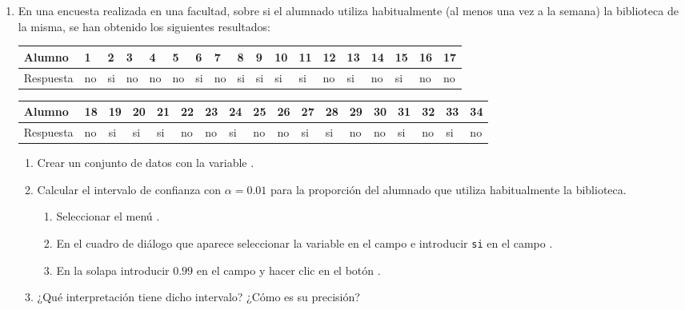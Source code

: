 \begin{enumerate}[leftmargin=*]
\item En una encuesta realizada en una facultad, sobre si el alumnado utiliza habitualmente (al menos una vez a la
semana) la biblioteca de la misma, se han obtenido los siguientes resultados:
\begin{flushleft}
\begin{tabular}{|l|l|l|l|l|l|l|l|l|l|l|l|l|l|l|l|l|l|}
\hline
Alumno & 1 & 2 & 3 & 4 & 5 & 6 & 7 & 8 & 9 & 10 & 11 & 12 & 13 & 14 & 15 & 16 & 17 \\
\hline
Respuesta & no & si & no & no & no & si & no & si & si & si & si & no & si & no & si & no & no \\
\hline
\end{tabular}
\newline

\begin{tabular}{|l|l|l|l|l|l|l|l|l|l|l|l|l|l|l|l|l|l|}
\hline
Alumno & 18 & 19 & 20 & 21 & 22 & 23 & 24 & 25 & 26 & 27 & 28 & 29 & 30 & 31 & 32 & 33 & 34 \\
\hline
Respuesta & no & si & si & si & no & no & si & no & no & si & si & no & no & si & no & si & no \\
\hline
\end{tabular}
\end{flushleft}

\begin{enumerate}
\item Crear un conjunto de datos con la variable .
\item Calcular el intervalo de confianza con $\alpha=0.01$ para la proporción del alumnado que utiliza habitualmente la biblioteca. 
\begin{indicacion}{
\begin{enumerate}
\item Seleccionar el menú .
\item En el cuadro de diálogo que aparece seleccionar la variable  en el campo  e
introducir \texttt{si} en el campo .
\item En la solapa  introducir $0.99$ en el campo  y hacer clic en
el botón .
\end{enumerate}
}
\end{indicacion}

\item ¿Qué interpretación tiene dicho intervalo? ¿Cómo es su precisión?


\end{enumerate}
\end{enumerate}

